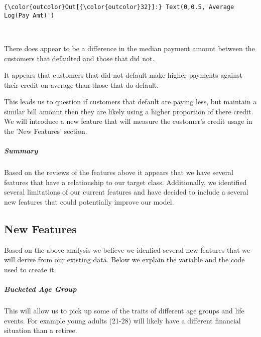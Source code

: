 \documentclass[11pt]{article}
\begin{document}
\begin{Verbatim}[commandchars=\\\{\}]
{\color{outcolor}Out[{\color{outcolor}32}]:} Text(0,0.5,'Average Log(Pay Amt)')
\end{Verbatim}
            
    \begin{center}
    \end{center}
    { \hspace*{\fill} \\}
    
    There does appear to be a difference in the median payment amount
between the customers that defaulted and those that did not.

It appears that customers that did not default make higher payments
against their credit on average than those that do default.

This leads us to question if customers that default are paying less, but
maintain a similar bill amount then they are likely using a higher
proportion of there credit. We will introduce a new feature that will
measure the customer's credit usage in the 'New Features' section.

    \subparagraph{\texorpdfstring{\emph{Summary}}{Summary}}\label{summary}

Based on the reviews of the features above it appears that we have
several features that have a relationship to our target class.
Additionally, we identified several limitations of our current features
and have decided to include a several new features that could
potentially improve our model.

    \subsection{New Features}\label{new-features}

Based on the above analysis we believe we idenfied several new features
that we will derive from our existing data. Below we explain the
variable and the code used to create it.

    \subparagraph{\texorpdfstring{\emph{Bucketed Age
Group}}{Bucketed Age Group}}\label{bucketed-age-group}

This will allow us to pick up some of the traits of different age groups
and life events. For example young adults (21-28) will likely have a
different financial situation than a retiree.
\end{document}
